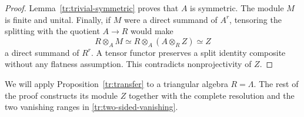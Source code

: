 \begin{proof}
Lemma~\ref{tr:trivial-symmetric} proves that $A$ is symmetric.  The
module $M$ is finite and unital.  Finally, if $M$ were a direct summand
of $A^r$, tensoring the splitting with the quotient $A\to R$ would make
\[
 R\otimes_A M\simeq R\otimes_A(A\otimes_RZ)\simeq Z
\]
a direct summand of $R^r$.  A tensor functor preserves a split identity
composite without any flatness assumption.  This contradicts
nonprojectivity of $Z$.
\end{proof}

We will apply Proposition~\ref{tr:transfer} to a triangular algebra
$R=\Lambda$.  The rest of the proof constructs its module $Z$ together
with the complete resolution and the two vanishing ranges in
\eqref{tr:two-sided-vanishing}.
